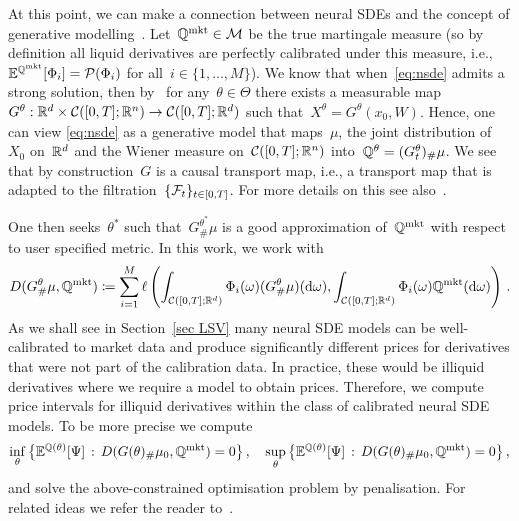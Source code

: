 At this point, we can make a connection between neural SDEs and the concept of generative modelling~\cite{Goodfellow2020GenerativeNetworks,Kingma2013Auto-EncodingBayes}. Let~$\mathbb{Q}^{\textup{mkt}} \in \mathcal{M}$ be the true martingale measure (so by definition all liquid derivatives are perfectly calibrated  under this measure, i.e.,~$\mathbb{E}^{\mathbb{Q}^{\textup{mkt}}}[\Phi_i] = \mathcal{P}(\Phi_i)$ for all~$i\in\{1,\ldots,M\}$).
We know that when~\eqref{eq:nsde} admits a strong solution, then by~\cite[Corollary 3.23]{Karatzas2012BrownianCalculus} for any~$\theta \in \Theta$ there exists a measurable map~$G^\theta:\mathbb{R}^d \times \mathcal{C}([0,T]; \mathbb{R}^{n}) \to  \mathcal{C}([0,T];\mathbb{R}^d)$ such that~$X^{\theta} = G^\theta(x_0, W)$. 
Hence, one can view \eqref{eq:nsde} as a generative model that maps~$\mu$, the joint distribution of~$X_0$ on~$\mathbb{R}^d$ and the Wiener measure on~$\mathcal{C}([0,T];\mathbb{R}^n)$ into~$\mathbb{Q}^{\theta} = (G^\theta_t)_{\#}\mu$. 
We see that by construction~$G$ is a causal transport map, i.e., a transport map that is adapted to the filtration~$\{\mathcal{F}_t\}_{t\in [0,T]}$. For more details on this see also~\cite{Acciaio2020CausalOptimization, Lassalle2013CausalProblems}.

One then seeks~$\theta^{\ast}$ such that~$G^{\theta^{\ast}}_{\#}\mu$ is a good approximation of~$\mathbb{Q}^{\textup{mkt}}$ with respect to user specified metric. In this work, we work with 
\[
D(G^\theta_{\#}\mu, \mathbb{Q}^{\textup{mkt}})\coloneqq  \sum_{i=1}^M\ell\left(\int_{\mathcal{C}([0,T];\mathbb{R}^d)} \Phi_{i}(\omega)(G^\theta_{\#}\mu)(\mathrm{d}\omega), \int_{\mathcal{C}([0,T];\mathbb{R}^d)} \Phi_i(\omega) \mathbb{Q}^{\textup{mkt}}(\mathrm{d}\omega) \right)\,.
\] 
As we shall see in Section~\ref{sec LSV} many neural SDE models can be well-calibrated to market data and produce significantly different prices for derivatives that were not part of the calibration data.
In practice, these would be illiquid derivatives where we require a model to obtain prices.
Therefore, we compute price intervals for illiquid derivatives within the class of calibrated neural SDE models. To be more precise we compute 
\[
\inf_{\theta} \big\{ \mathbb{E}^{ \mathbb{Q}(\theta)}[\Psi] \, :\, D(G(\theta)_{\#}\mu_0,\mathbb{Q}^{\textup{mkt}})=0 \big\} \,,\quad
\sup_{\theta} \big\{ \mathbb{E}^{\mathbb{Q}(\theta)}[\Psi] \, :\, D(G(\theta)_{\#}\mu_0,\mathbb{Q}^{\textup{mkt}})=0 \big\}\,,
\]
and solve the above-constrained optimisation problem by penalisation. For related ideas we refer the reader to~\cite{Eckstein2019ComputationNetworks}.

